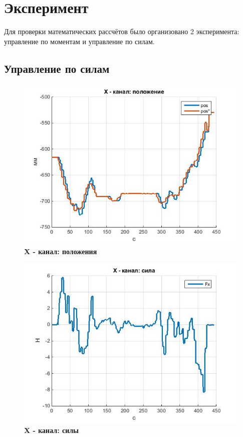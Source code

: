 \documentclass[a4paper,14pt,russian]{extreport} \usepackage{extsizes}
\begin{document}
	\chapter{Эксперимент}
	Для проверки математических рассчётов было организовано 2 эксперимента: управление по моментам и управление по силам.	
	\section{Управление по силам}
		\begin{figure}[h]
			\centering		 
			\includegraphics[width=5.5in]{./graph/posX.jpg}	
			\caption{
				\textbf{X - канал: положения}
			}     
			\label{fig_img41}
		\end{figure}
		\begin{figure}[h]
			\centering		 
			\includegraphics[width=5.5in]{./graph/powX.jpg}	
			\caption{
				\textbf{X - канал: силы}
				}
			\label{fig_img42}
		\end{figure}
\end{document}
